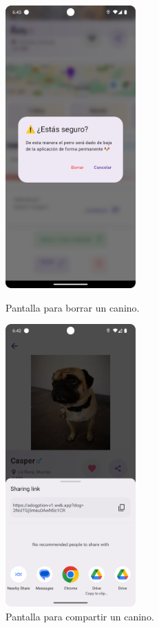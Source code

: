 \documentclass[a4paper, 12pt]{article}
\begin{document}
\begin{figure}[H]
   	\begin{minipage}{0.48\textwidth}
		\begin{center}
			{\includegraphics[width=5cm]{app/DeleteDog.png}\par}
			\caption{Pantalla para borrar un canino.}
		\end{center}  
	\end{minipage}\hfill
   	\begin{minipage}{0.48\textwidth}
		\begin{center}
			{\includegraphics[width=5cm]{app/ShareAction.png}\par}
			\caption{Pantalla para compartir un canino.}
		\end{center}  
	\end{minipage}\hfill
\end{figure}
\end{document}
